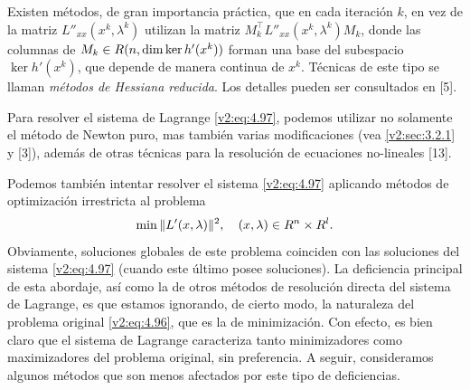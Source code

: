 
Existen métodos, de gran importancia práctica, que en cada iteración $k$, en vez de la matriz $L''_{xx}(x^k, \lambda^k)$ utilizan la matriz $M_k^\top L''_{xx}(x^k, \lambda^k) M_k$, donde las columnas de $M_k \in R(n, \dim \ker h'(x^k))$ forman una base del subespacio $\ker h'(x^k)$, que depende de manera continua de $x^k$. Técnicas de este tipo se llaman \textit{métodos de Hessiana reducida}. Los detalles pueden ser consultados en [5].

Para resolver el sistema de Lagrange \eqref{v2:eq:4.97}, podemos utilizar no solamente el método de Newton puro, mas también varias modificaciones (vea \cref{v2:sec:3.2.1} y [3]), además de otras técnicas para la resolución de ecuaciones no-lineales [13].

Podemos también intentar resolver el sistema \eqref{v2:eq:4.97} aplicando métodos de optimización irrestricta al problema
\begin{equation}
    \min \|L'(x, \lambda)\|^2, \quad (x, \lambda) \in R^n \times R^l.
    \label{v2:eq:4.103}
\end{equation}
Obviamente, soluciones globales de este problema coinciden con las soluciones del sistema \eqref{v2:eq:4.97} (cuando este último posee soluciones). La deficiencia principal de esta abordaje, así como la de otros métodos de resolución directa del sistema de Lagrange, es que estamos ignorando, de cierto modo, la naturaleza del problema original \eqref{v2:eq:4.96}, que es la de minimización. Con efecto, es bien claro que el sistema de Lagrange caracteriza tanto minimizadores como maximizadores del problema original, sin preferencia. A seguir, consideramos algunos métodos que son menos afectados por este tipo de deficiencias.